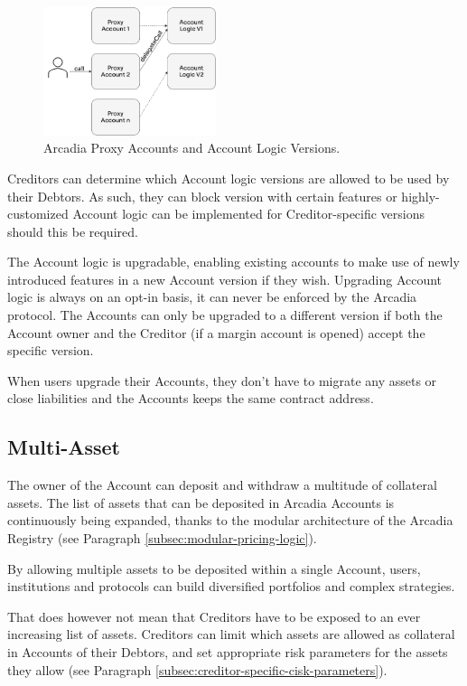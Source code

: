 \documentclass[sigconf,nonacm]{acmart}
\begin{document}
\begin{figure}
    \centering
    \includegraphics[width=0.45\textwidth]{images/Proxy-Accounts.png}
    \caption{Arcadia Proxy Accounts and Account Logic Versions. \label{fig:proxy-accounts}}
\end{figure}

Creditors can determine which Account logic versions are allowed to be used by their Debtors.
As such, they can block version with certain features or highly-customized Account logic can be implemented for Creditor-specific versions should this be required.

The Account logic is upgradable, enabling existing accounts to make use of newly introduced features in a new Account version if they wish.
Upgrading Account logic is always on an opt-in basis, it can never be enforced by the Arcadia protocol.
The Accounts can only be upgraded to a different version if both the Account owner and the Creditor (if a margin account is opened) accept the specific version.

When users upgrade their Accounts, they don't have to migrate any assets or close liabilities and the Accounts keeps the same contract address.

\subsection{Multi-Asset}
\label{subsec:multi-asset}
The owner of the Account can deposit and withdraw a multitude of collateral assets.
The list of assets that can be deposited in Arcadia Accounts is continuously being expanded, thanks to the modular architecture of the Arcadia Registry (see Paragraph \ref{subsec:modular-pricing-logic}).

By allowing multiple assets to be deposited within a single Account, users, institutions and protocols can build diversified portfolios and complex strategies.

That does however not mean that Creditors have to be exposed to an ever increasing list of assets.
Creditors can limit which assets are allowed as collateral in Accounts of their Debtors,
and set appropriate risk parameters for the assets they allow (see Paragraph \ref{subsec:creditor-specific-cisk-parameters}).
\end{document}
